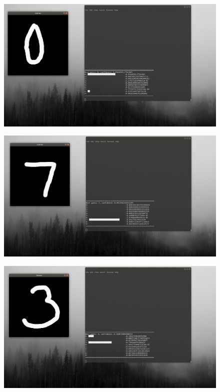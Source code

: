\documentclass[12pt]{article}
\begin{document}
\begin{figure}[H]{}
    \centering
    \includegraphics[scale=0.25]{../images/4.png}
\end{figure}

\begin{figure}[H]{}
    \centering
    \includegraphics[scale=0.25]{../images/5.png}
\end{figure}

\begin{figure}[H]{}
    \centering
    \includegraphics[scale=0.25]{../images/6.png}
\end{figure}
\end{document}

